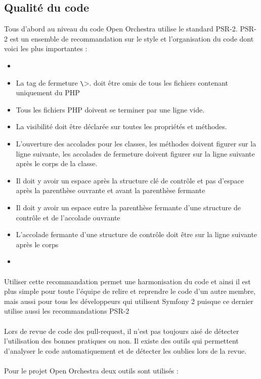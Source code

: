 \subsection{Qualité du code}
Tous d'abord au niveau du code Open Orchestra utilise le standard PSR-2. PSR-2 est un ensemble de recommandation sur le style et l'organisation du code dont voici les plus importantes : 
\begin{itemize}
\item[]
\item La tag de fermeture \verb?\?>. doit être omis de tous les fichiers contenant uniquement du PHP
\item Tous les fichiers PHP doivent se terminer par une ligne vide.
\item La visibilité doit être déclarée sur toutes les propriétés et méthodes.
\item L'ouverture des accolades pour les classes, les méthodes doivent figurer sur la ligne suivante, les accolades de fermeture doivent figurer sur la ligne suivante après le corps de la classe.
\item Il doit y avoir un espace après la structure clé de contrôle et pas d'espace après la parenthèse ouvrante et avant la parenthèse fermante
\item Il doit y avoir un espace entre la parenthèse fermante d'une structure de contrôle et de l'accolade
 ouvrante
 \item L'accolade fermante d'une structure de contrôle doit être sur la ligne suivante après le corps
 \item[]
\end{itemize}
\paragraph{}
Utiliser cette recommandation permet une harmonisation du code et ainsi il est plus simple pour toute l'équipe de relire et reprendre le code d'un autre membre, mais aussi pour tous les développeurs qui utilisent Symfony 2 puisque ce dernier utilise aussi les recommandations PSR-2
\paragraph{}
Lors de revue de code des pull-request, il n'est pas toujours aisé de détecter l'utilisation des bonnes pratiques ou non. Il existe des outils qui permettent d'analyser le code automatiquement et de détecter les oublies lors de la revue.
\paragraph{}
Pour le projet Open Orchestra deux outils sont utilisés : 
